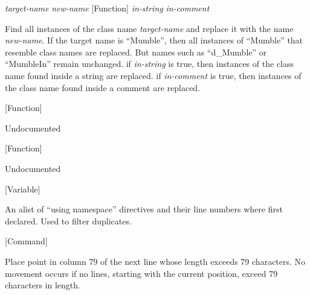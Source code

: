 \vspace{1em}
\noindent
{}
\usebox{\funcname}\emph{target-name} \emph{new-name}
 \hfill [Function]
\hspace*{\wd\funcname}\emph{in-string} \emph{in-comment}

\begin{doc-string}
Find all instances of the class name \emph{target-name} and replace it with the name
\emph{new-name}.  If the target name is ``Mumble'', then all instances of ``Mumble''
that resemble class names are replaced.  But names such as ``d\_Mumble'' or
``MumbleIn'' remain unchanged.  if \emph{in-string} is true, then instances of the
class name found inside a string are replaced.  if \emph{in-comment} is true, then
instances of the class name found inside a comment are replaced.
\end{doc-string}

\vspace{1em}
\noindent
{}
\usebox{\funcname}
 \hfill [Function]

\begin{doc-string}
Undocumented
\end{doc-string}

\vspace{1em}
\noindent
{}
\usebox{\funcname}
 \hfill [Function]

\begin{doc-string}
Undocumented
\end{doc-string}

\vspace{1em}
\noindent
{}
\usebox{\funcname}
 \hfill [Variable]

\begin{doc-string}
An alist of ``using namespace'' directives and their line numbers where first declared.
Used to filter duplicates.
\end{doc-string}

\vspace{1em}
\noindent
{}
\usebox{\funcname}
 \hfill [Command]

\begin{doc-string}
Place point in column 79 of the next line whose length exceeds 79 characters.
No movement occurs if no lines, starting with the current position, exceed 79
characters in length.
\end{doc-string}

